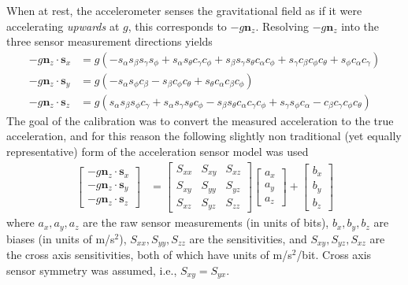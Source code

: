 When at rest, the accelerometer senses the gravitational field as if it were
accelerating \textit{upwards} at $g$, this corresponds to $-g\bm{n}_z$.
Resolving $-g\bm{n}_z$ into the three sensor measurement directions yields
\begin{align}
  \label{rb:eq:imux}
-g\bm{n}_z \cdot \bm{s}_x &= g \left(- s_{\alpha}
s_{\beta} s_{\gamma}
s_{\phi} + s_{\alpha}
s_{\theta} c_{\gamma}
c_{\phi} + s_{\beta}
s_{\gamma} s_{\theta}
c_{\alpha} c_{\phi} +
s_{\gamma} c_{\beta}
c_{\phi} c_{\theta} +
s_{\phi} c_{\alpha}
c_{\gamma}\right) \\
%
  \label{rb:eq:imuy}
-g\bm{n}_z \cdot \bm{s}_y &= g \left(- s_{\alpha}
s_{\phi} c_{\beta} -
s_{\beta} c_{\phi}
c_{\theta} + s_{\theta}
c_{\alpha} c_{\beta}
c_{\phi}\right) \\
%
  \label{rb:eq:imuz}
-g\bm{n}_z \cdot \bm{s}_z &= g \left(s_{\alpha}
s_{\beta} s_{\phi}
c_{\gamma} + s_{\alpha}
s_{\gamma} s_{\theta}
c_{\phi} - s_{\beta}
s_{\theta} c_{\alpha}
c_{\gamma} c_{\phi} +
s_{\gamma} s_{\phi}
c_{\alpha} - c_{\beta}
c_{\gamma} c_{\phi}
c_{\theta}\right)
\end{align}
The goal of the calibration was to convert the measured acceleration to the
true acceleration, and for this reason the following slightly non traditional
(yet equally representative) form of the acceleration sensor model was used
\begin{align}
  \label{rb:eq:sensormodel}
  \left[
    \begin{matrix}
      -g\bm{n}_z \cdot \bm{s}_x \\
      -g\bm{n}_z \cdot \bm{s}_y \\
      -g\bm{n}_z \cdot \bm{s}_z
    \end{matrix}
  \right]
  &=
  \left[
    \begin{matrix}
      S_{xx} & S_{xy} & S_{xz}\\
      S_{xy} & S_{yy} & S_{yz}\\
      S_{xz} & S_{yz} & S_{zz}
    \end{matrix}
  \right]
  \left[
    \begin{matrix}
      a_{x} \\
      a_{y} \\
      a_{z}
    \end{matrix}
  \right]
  +
  \left[
    \begin{matrix}
      b_{x} \\
      b_{y} \\
      b_{z}
    \end{matrix}
  \right]
\end{align}
where $a_x, a_y, a_z$ are the raw sensor measurements (in units of bits), $b_x,
b_y, b_z$ are biases (in units of m/s$^2$), $S_{xx}, S_{yy}, S_{zz}$ are the
sensitivities, and $S_{xy}, S_{yz}, S_{xz}$ are the cross axis sensitivities,
both of which have units of m/s$^2$/bit. Cross axis sensor symmetry was
assumed, i.e., $S_{xy} = S_{yx}$.

